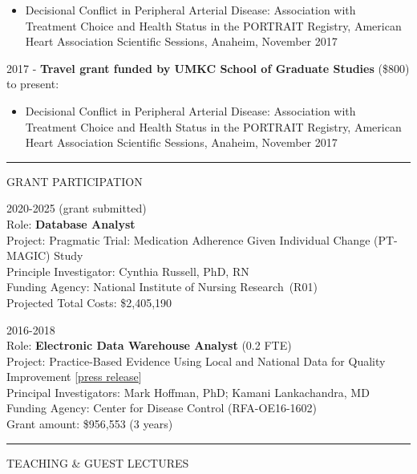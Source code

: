 \documentclass[
]{article}
\providecommand{\tightlist}{%
  \setlength{\itemsep}{0pt}\setlength{\parskip}{0pt}}
\begin{document}
\begin{itemize}
\tightlist
\item
  Decisional Conflict in Peripheral Arterial Disease: Association with
  Treatment Choice and Health Status in the PORTRAIT Registry, American
  Heart Association Scientific Sessions, Anaheim, November 2017
\end{itemize}

2017 - \textbf{Travel grant funded by UMKC School of Graduate Studies}
(\$800) to present:

\begin{itemize}
\tightlist
\item
  Decisional Conflict in Peripheral Arterial Disease: Association with
  Treatment Choice and Health Status in the PORTRAIT Registry, American
  Heart Association Scientific Sessions, Anaheim, November 2017
\end{itemize}

\begin{center}\rule{0.5\linewidth}{0.5pt}\end{center}

GRANT PARTICIPATION

2020-2025 (grant submitted)\\
Role: \textbf{Database Analyst}\\
Project: Pragmatic Trial: Medication Adherence Given Individual Change
(PT-MAGIC) Study\\
Principle Investigator: Cynthia Russell, PhD, RN\\
Funding Agency: National Institute of Nursing Research~(R01)\\
Projected Total Costs: \$2,405,190

2016-2018\\
Role: \textbf{Electronic Data Warehouse Analyst} (0.2 FTE)\\
Project: Practice-Based Evidence Using Local and National Data for
Quality Improvement
{[}\href{https://info.umkc.edu/umatters/umkc-tmc-and-childrens-mercy-win-930k-grant-from-cdc/}{press
release}{]}\\
Principal Investigators: Mark Hoffman, PhD; Kamani Lankachandra, MD\\
Funding Agency: Center for Disease Control (RFA-OE16-1602)\\
Grant amount: \$956,553 (3 years)

\begin{center}\rule{0.5\linewidth}{0.5pt}\end{center}

TEACHING \& GUEST LECTURES
\end{document}
